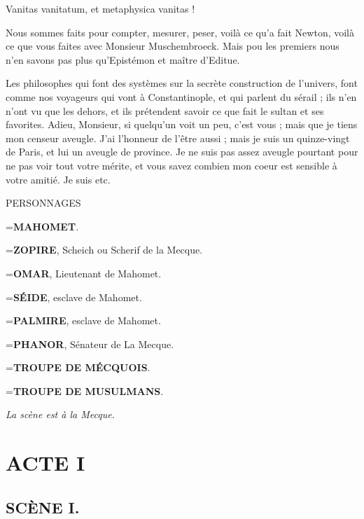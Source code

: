 \documentclass[french,twoside]{book} %
\newcommand{\castItem}[1]{{\noindent\hangindent=\parindent #1\par}}
\newcommand{\dateline}[1]{\medskip{\RaggedLeft{#1}\par}\bigskip}
\newcommand\chapteropen{} %
\newcommand\chaptercont{} %
\begin{document}
Vanitas vanitatum, et metaphysica vanitas !\par
Nous sommes faits pour compter, mesurer, peser, voilà ce qu’a fait Newton, voilà ce que vous faites avec Monsieur Muschembroeck. Mais pou les premiers nous n’en savons pas plus qu’Epistémon et maître d’Editue.\par
Les philosophes qui font des systèmes sur la secrète construction de l’univers, font comme nos voyageurs qui vont à Constantinople, et qui parlent du sérail ; ils n’en n’ont vu que les dehors, et ils prétendent savoir ce que fait le sultan et ses favorites. Adieu, Monsieur, si quelqu’un voit un peu, c’est vous ; mais que je tiens mon censeur aveugle. J’ai l’honneur de l’être aussi ; mais je suis un quinze-vingt de Paris, et lui un aveugle de province. Je ne suis pas assez aveugle pourtant pour ne pas voir tout votre mérite, et vous savez combien mon coeur est sensible à votre amitié. Je suis etc.\par

\dateline{À Ciray, le 1er juin 1741.}

\bigbreak
{\centering PERSONNAGES\par}\nopagebreak\bigskip\nopagebreak
\castItem{\textbf{MAHOMET}.}

\castItem{\textbf{ZOPIRE}, Scheich ou Scherif de la Mecque.}

\castItem{\textbf{OMAR}, Lieutenant de Mahomet.}

\castItem{\textbf{SÉIDE}, esclave de Mahomet.}

\castItem{\textbf{PALMIRE}, esclave de Mahomet.}

\castItem{\textbf{PHANOR}, Sénateur de La Mecque.}

\castItem{\textbf{TROUPE DE MÉCQUOIS}.}

\castItem{\textbf{TROUPE DE MUSULMANS}.}
\bigbreak

{\centering\it La scène est à la Mecque.\par}\nobreakpage\bigskip\nobreakpage

\mainmatter


\chapteropen

\chapter[{ACTE I}]{ACTE I}
\renewcommand{\leftmark}{ACTE I}
\label{I}


\chaptercont

\section[{SCÈNE I.}]{SCÈNE I.}
\label{I01}
\end{document}
